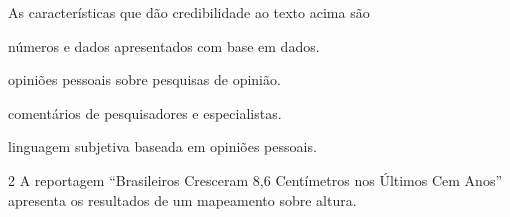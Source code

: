 As características que dão credibilidade ao texto acima são

\begin{escolha}
\item números e dados apresentados com base em dados.

\item opiniões pessoais sobre pesquisas de opinião.

\item comentários de pesquisadores e especialistas.

\item linguagem subjetiva baseada em opiniões pessoais.
\end{escolha}

\num{2} A reportagem ``Brasileiros Cresceram 8,6 Centímetros nos Últimos Cem
Anos'' apresenta os resultados de um mapeamento sobre altura.

